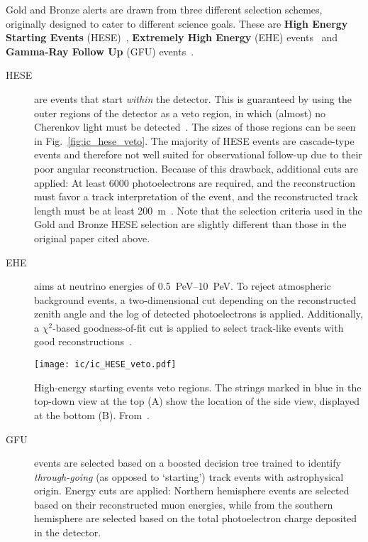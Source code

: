 Gold and Bronze alerts are drawn from three different selection schemes, originally designed to cater to different science goals. These are \textbf{High Energy Starting Events} (HESE)~, \textbf{Extremely High Energy} (EHE) events~ and \textbf{Gamma-Ray Follow Up} (GFU) events~.

\begin{description}

    \item[HESE] are events that start \textit{within} the detector. This is guaranteed by using the outer regions of the detector as a veto region, in which (almost) no Cherenkov light must be detected~\cite{Aartsen2013}. The sizes of those regions can be seen in Fig.~\ref{fig:ic_hese_veto}. The majority of HESE events are cascade-type events and therefore not well suited for observational follow-up due to their poor angular reconstruction. Because of this drawback, additional cuts are applied: At least 6000 photoelectrons are required, and the reconstruction must favor a track interpretation of the event, and the reconstructed track length must be at least \SI{200}{\meter}~\cite{Abbasi2023}. Note that the selection criteria used in the Gold and Bronze HESE selection are slightly different than those in the original paper cited above.

    \item[EHE] aims at neutrino energies of \SIrange{0.5}{10}{\peta\eV}. To reject atmospheric background events, a two-dimensional cut depending on the reconstructed zenith angle and the log of detected photoelectrons is applied. Additionally, a $\chi^2$-based goodness-of-fit cut is applied to select track-like events with good reconstructions~\cite{Abbasi2023}.

        \begin{marginfigure}
            \texttt{[image: ic/ic\_HESE\_veto.pdf]}
            \caption[HESE veto regions]{High-energy starting events veto regions. The strings marked in blue in the top-down view at the top (A) show the location of the side view, displayed at the bottom (B). From~\cite{Aartsen2013}.}
        \end{marginfigure}

    \item[GFU] events are selected based on a boosted decision tree trained to identify \textit{through-going} (as opposed to `starting') track events with astrophysical origin. Energy cuts are applied: Northern hemisphere events are selected based on their reconstructed muon energies, while from the southern hemisphere are selected based on the total photoelectron charge deposited in the detector.
\end{description}

